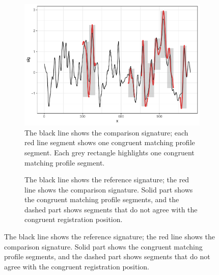 \begin{figure}[hbt]
\begin{subfigure}[t]{\textwidth}
\caption{\label{fig:sigplot}The black line shows the comparison signature; each red line segment shows one congruent matching profile segment. Each grey rectangle highlights one congruent matching profile segment.}
\vspace{1em}
\begin{adjustbox}{valign=t}
\begin{minipage}{.39\textwidth}

{\small {}
\begin{Schunk}
\end{Schunk}
}
\vspace{1em}
\end{minipage}
\begin{minipage}{.59\textwidth}
\includegraphics[width=\textwidth]{ju-hofmann_files/figure-latex/sigplot-1.pdf}
\end{minipage}
\end{adjustbox}
\end{subfigure}
\begin{subfigure}[t]{\textwidth}
\caption{\label{fig:sigplot2}The black line shows the reference signature; the red line shows the comparison signature. Solid part shows the congruent matching profile segments, and the dashed part shows segments that do not agree with the congruent registration position.}
\vspace{1em}
\begin{adjustbox}{valign=t}
\begin{minipage}{.39\textwidth}


\end{minipage}
\end{adjustbox}
\end{subfigure}
\end{figure}
